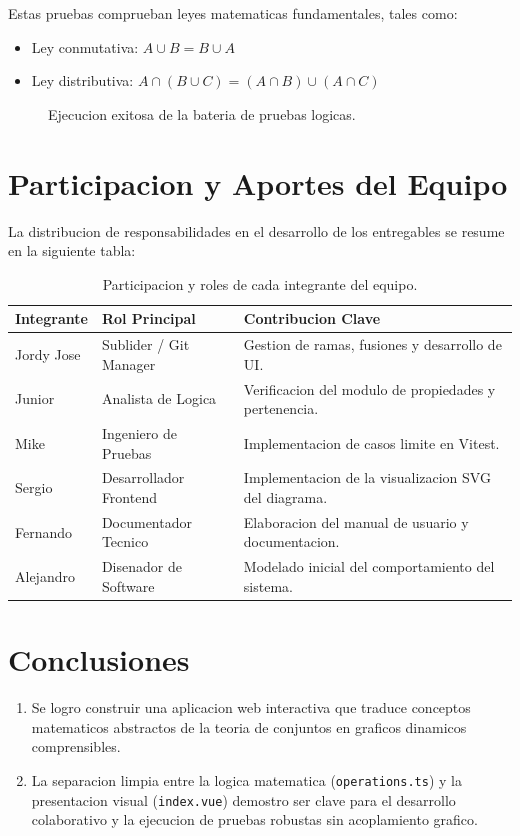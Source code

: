 \documentclass[12pt,a4paper]{article}
\begin{document}
Estas pruebas comprueban leyes matematicas fundamentales, tales como:
\begin{itemize}
    \item Ley conmutativa: $A \cup B = B \cup A$
    \item Ley distributiva: $A \cap (B \cup C) = (A \cap B) \cup (A \cap C)$
\end{itemize}

\begin{figure}[H]
    \centering
    \caption{Ejecucion exitosa de la bateria de pruebas logicas.}
    \label{fig:tests}
\end{figure}

\section{Participacion y Aportes del Equipo}
La distribucion de responsabilidades en el desarrollo de los entregables se resume en la siguiente tabla:

\begin{table}[H]
    \centering
    \caption{Participacion y roles de cada integrante del equipo.}
    \begin{tabular}{lll}
        \toprule
        \textbf{Integrante} & \textbf{Rol Principal} & \textbf{Contribucion Clave} \\
        \midrule
        Jordy Jose & Sublider / Git Manager & Gestion de ramas, fusiones y desarrollo de UI. \\
        Junior & Analista de Logica & Verificacion del modulo de propiedades y pertenencia. \\
        Mike & Ingeniero de Pruebas & Implementacion de casos limite en Vitest. \\
        Sergio & Desarrollador Frontend & Implementacion de la visualizacion SVG del diagrama. \\
        Fernando & Documentador Tecnico & Elaboracion del manual de usuario y documentacion. \\
        Alejandro & Disenador de Software & Modelado inicial del comportamiento del sistema. \\
        \bottomrule
    \end{tabular}
\end{table}

\section{Conclusiones}
\begin{enumerate}
    \item Se logro construir una aplicacion web interactiva que traduce conceptos matematicos abstractos de la teoria de conjuntos en graficos dinamicos comprensibles.
    \item La separacion limpia entre la logica matematica (\texttt{operations.ts}) y la presentacion visual (\texttt{index.vue}) demostro ser clave para el desarrollo colaborativo y la ejecucion de pruebas robustas sin acoplamiento grafico.
\end{enumerate}
\end{document}
